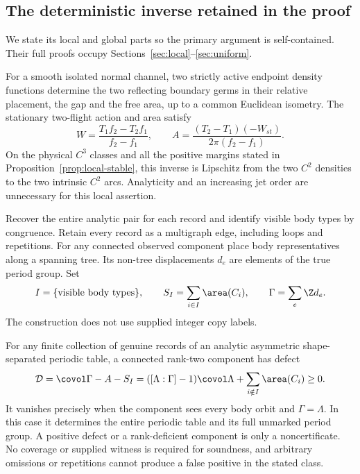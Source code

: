 \subsection{The deterministic inverse retained in the proof}
We state its local and global parts so the primary argument is self-contained.
Their full proofs occupy Sections~\ref{sec:local}--\ref{sec:uniform}.

\begin{theorem}\label{thm:local-main}
For a smooth isolated normal channel, two strictly active endpoint density
functions determine the two reflecting boundary germs in their relative
placement, the gap and the free area, up to a common Euclidean isometry.
The stationary two-flight action and area satisfy
\begin{equation}\label{eq:ratio-main}
 W=\frac{T_1f_2-T_2f_1}{f_2-f_1},\qquad
 A=\frac{(T_2-T_1)(-W_{st})}{2\pi(f_2-f_1)}.
\end{equation}
On the physical $C^3$ classes and all the positive margins stated in
Proposition~\ref{prop:local-stable}, this inverse is Lipschitz from the
two $C^2$ densities to the two intrinsic $C^2$ arcs. Analyticity and an
increasing jet order are unnecessary for this local assertion.
\end{theorem}

Recover the entire analytic pair for each record and identify visible
body types by congruence. Retain every record as a multigraph edge, including
loops and repetitions. For any connected observed component place body
representatives along a spanning tree. Its non-tree displacements $d_e$
are elements of the true period group. Set
\[
 I=\{\hbox{visible body types}\},\qquad
 S_I=\sum_{i\in I}\area(C_i),\qquad \Gamma=\sum_e\Z d_e.
\]
The construction does not use supplied integer copy labels.

\begin{theorem}
\label{thm:completion-main}
For any finite collection of genuine records of an analytic asymmetric
shape-separated periodic table, a connected rank-two component has defect
\begin{equation}\label{eq:defect-main}
 \mathcal D=\covol\Gamma-A-S_I
 =([\Lambda:\Gamma]-1)\covol\Lambda+\sum_{i\notin I}\area(C_i)\ge0.
\end{equation}
It vanishes precisely when the component sees every body orbit and
$\Gamma=\Lambda$. In this case it determines the entire periodic table
and its full unmarked period group. A positive defect or a rank-deficient
component is only a noncertificate. No coverage or supplied witness is
required for soundness, and arbitrary omissions or repetitions cannot
produce a false positive in the stated class.
\end{theorem}

